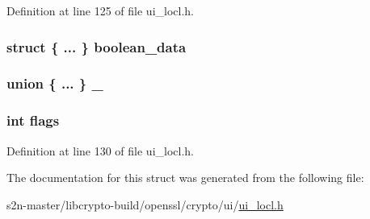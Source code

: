 Definition at line 125 of file ui\+\_\+locl.\+h.

\subsubsection[{\texorpdfstring{boolean\+\_\+data}{boolean_data}}]{\setlength{\rightskip}{0pt plus 5cm}struct \{ ... \}   boolean\+\_\+data}\hypertarget{structui__string__st_ae393662254d183fd0182fbf783d44b65}{}\label{structui__string__st_ae393662254d183fd0182fbf783d44b65}
\subsubsection[{\texorpdfstring{\+\_\+}{_}}]{\setlength{\rightskip}{0pt plus 5cm}union \{ ... \}   \+\_\+}\hypertarget{structui__string__st_a4a48cb933bc05132769be4806f309cbf}{}\label{structui__string__st_a4a48cb933bc05132769be4806f309cbf}
\subsubsection[{\texorpdfstring{flags}{flags}}]{\setlength{\rightskip}{0pt plus 5cm}int flags}\hypertarget{structui__string__st_ac8bf36fe0577cba66bccda3a6f7e80a4}{}\label{structui__string__st_ac8bf36fe0577cba66bccda3a6f7e80a4}


Definition at line 130 of file ui\+\_\+locl.\+h.



The documentation for this struct was generated from the following file\+:\begin{DoxyCompactItemize}
\item 
s2n-\/master/libcrypto-\/build/openssl/crypto/ui/\hyperlink{ui__locl_8h}{ui\+\_\+locl.\+h}\end{DoxyCompactItemize}
